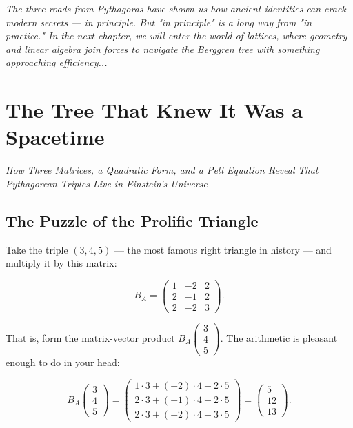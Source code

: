 \documentclass[11pt,openright,twoside]{book}
\theoremstyle{definition}
\begin{document}
\bigskip


\textit{The three roads from Pythagoras have shown us how ancient identities can crack modern secrets --- in principle. But "in principle" is a long way from "in practice." In the next chapter, we will enter the world of lattices, where geometry and linear algebra join forces to navigate the Berggren tree with something approaching efficiency...}

\clearpage


\chapter{The Tree That Knew It Was a Spacetime}
\label{ch:5}

\begin{center}
\textit{How Three Matrices, a Quadratic Form, and a Pell Equation Reveal That Pythagorean Triples Live in Einstein's Universe}
\end{center}
\bigskip




\bigskip


\section{The Puzzle of the Prolific Triangle}

Take the triple $(3, 4, 5)$ --- the most famous right triangle in history --- and multiply it by this matrix:

\[B_A = \begin{pmatrix} 1 & -2 & 2 \\ 2 & -1 & 2 \\ 2 & -2 & 3 \end{pmatrix}.\]

That is, form the matrix-vector product $B_A \begin{pmatrix} 3 \\ 4 \\ 5 \end{pmatrix}$. The arithmetic is pleasant enough to do in your head:

\[B_A \begin{pmatrix} 3 \\ 4 \\ 5 \end{pmatrix} = \begin{pmatrix} 1\cdot3 + (-2)\cdot4 + 2\cdot5 \\ 2\cdot3 + (-1)\cdot4 + 2\cdot5 \\ 2\cdot3 + (-2)\cdot4 + 3\cdot5 \end{pmatrix} = \begin{pmatrix} 5 \\ 12 \\ 13 \end{pmatrix}.\]
\end{document}
